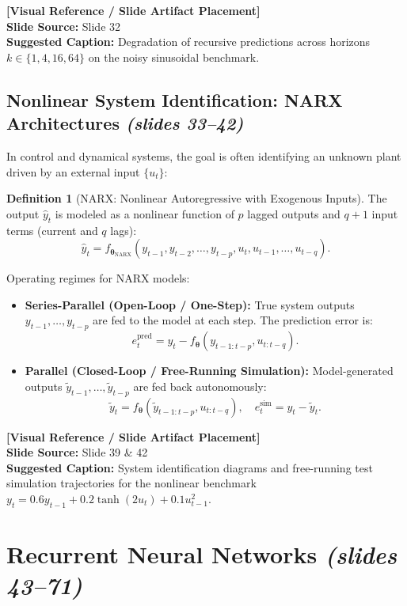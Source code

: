 \documentclass[11pt,a4paper]{article}
\theoremstyle{definition}
\newtheorem{definition}{Definition}[section]
\theoremstyle{plain}
\newcommand{\slideimageplaceholder}[2]{
    \begin{center}
    \begin{tcolorbox}[
        enhanced,
        colback=gray!8!white,
        colframe=gray!60!black,
        width=0.92\textwidth,
        arc=2mm,
        frame hidden,
        borderline={0.5mm}{0mm}{gray!60!black, dashed},
        halign=center
    ]
        \vspace{0.4cm}
        \textbf{\textsf{[Visual Reference / Slide Artifact Placement]}} \\
        \vspace{0.2cm}
        \textsf{\textbf{Slide Source:} Slide #1} \\
        \textsf{\textbf{Suggested Caption:} #2}
        \vspace{0.4cm}
    \end{tcolorbox}
    \end{center}
}
\begin{document}
\slideimageplaceholder{32}{Degradation of recursive predictions across horizons $k \in \{1, 4, 16, 64\}$ on the noisy sinusoidal benchmark.}

\subsection{Nonlinear System Identification: NARX Architectures \emph{(slides 33--42)}}
In control and dynamical systems, the goal is often identifying an unknown plant driven by an external input $\{u_t\}$:

\begin{definition}[NARX: Nonlinear Autoregressive with Exogenous Inputs]
The output $\hat{y}_t$ is modeled as a nonlinear function of $p$ lagged outputs and $q+1$ input terms (current and $q$ lags):
\begin{equation}
    \hat{y}_t = f_{\boldsymbol{\theta}_{\text{NARX}}}(y_{t-1}, y_{t-2}, \dots, y_{t-p}, u_t, u_{t-1}, \dots, u_{t-q}).
\end{equation}
\end{definition}

Operating regimes for NARX models:
\begin{itemize}
    \item \textbf{Series-Parallel (Open-Loop / One-Step):} True system outputs $y_{t-1}, \dots, y_{t-p}$ are fed to the model at each step. The prediction error is:
    \begin{equation}
        e_t^{\text{pred}} = y_t - f_{\boldsymbol{\theta}}(y_{t-1:t-p}, u_{t:t-q}).
    \end{equation}
    \item \textbf{Parallel (Closed-Loop / Free-Running Simulation):} Model-generated outputs $\tilde{y}_{t-1}, \dots, \tilde{y}_{t-p}$ are fed back autonomously:
    \begin{equation}
        \tilde{y}_t = f_{\boldsymbol{\theta}}(\tilde{y}_{t-1:t-p}, u_{t:t-q}), \quad e_t^{\text{sim}} = y_t - \tilde{y}_t.
    \end{equation}
\end{itemize}

\slideimageplaceholder{39 \& 42}{System identification diagrams and free-running test simulation trajectories for the nonlinear benchmark $y_t = 0.6y_{t-1} + 0.2\tanh(2u_t) + 0.1u_{t-1}^2$.}

\section{Recurrent Neural Networks \emph{(slides 43--71)}}
\end{document}
